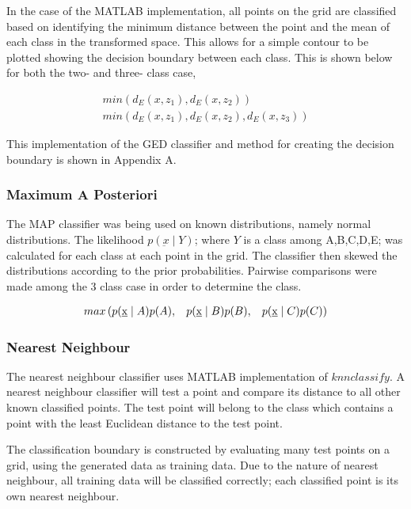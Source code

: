 In the case of the MATLAB implementation, all points on the grid are classified based on identifying the minimum distance between the point and the mean of each class in the transformed space. This allows for a simple contour to be plotted showing the decision boundary between each class. This is shown below for both the two- and three- class case,

\begin{eqnarray}
\label{eqn:pointClass-GED}
min(d_{E} (x,z_{1}), d_{E} (x,z_{2})) \\
min(d_{E} (x,z_{1}), d_{E} (x,z_{2}), d_{E} (x,z_{3}))
\end{eqnarray}


This implementation of the GED classifier and method for creating the decision boundary is shown in Appendix A.

\subsubsection{Maximum A Posteriori}

The MAP classifier was being used on known distributions, namely normal distributions. The likelihood $p(\underbar{x} \mid Y)$; where $Y$ is a class among A,B,C,D,E; was calculated for each class at each point in the grid. The classifier then skewed the distributions according to the prior probabilities. Pairwise comparisons were made among the 3 class case in order to determine the class.

\begin{eqnarray}
\label{eqn:pointClass-MAP}
 max \left( p(\underbar{x} \mid A)p(A), \hspace{3mm} p(\underbar{x} \mid B)p(B) , \hspace{3mm} p(\underbar{x} \mid C)p(C) \right) 
\end{eqnarray}

\subsubsection{Nearest Neighbour}

The nearest neighbour classifier uses MATLAB implementation of $knnclassify$. A nearest neighbour classifier will test a point and compare its distance to all other known classified points. The test point will belong to the class which contains a point with the least Euclidean distance to the test point.

The classification boundary is constructed by evaluating many test points on a grid, using the generated data as training data. Due to the nature of nearest neighbour, all training data will be classified correctly; each classified point is its own nearest neighbour.

